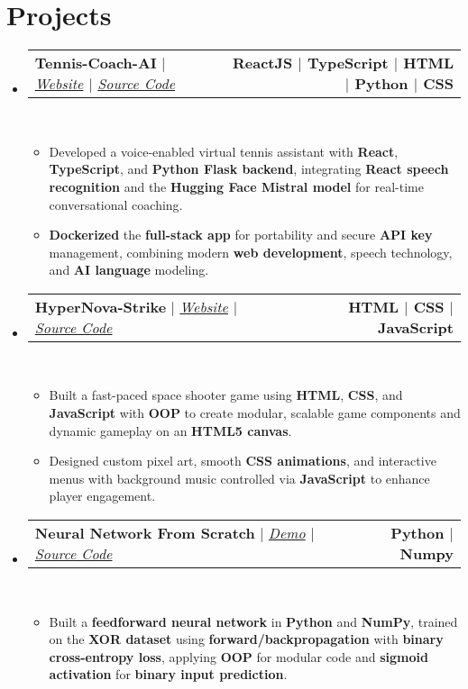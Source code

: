 \documentclass[letterpaper,11pt]{article}
\makeatletter
\newcommand{\resumeItem}[1]{
  \item\small{
    {#1 \vspace{0pt}}
  }
}
\newcommand{\resumeProjectHeading}[2]{
    \item
    \begin{tabular*}{1.001\textwidth}{l@{\extracolsep{\fill}}r}
      \small#1 & \textbf{\small #2}\\
    \end{tabular*}\vspace{-7pt}
}
\newcommand{\resumeSubHeadingListStart}{\begin{itemize}[leftmargin=0.0in, label={}]}
\newcommand{\resumeSubHeadingListEnd}{\end{itemize}}\vspace{0pt}
\newcommand{\resumeItemListStart}{\begin{itemize}}
\newcommand{\resumeItemListEnd}{\end{itemize}\vspace{-5pt}}
\makeatother
\begin{document}
\section{Projects} 
    \vspace{-5pt}
    \resumeSubHeadingListStart
    \resumeProjectHeading
            {\textbf{{Tennis-Coach-AI}} $|$ \emph{\href{https://tennis-coach-ai.vercel.app}{Website}{ $|$ }\href{https://github.com/TejasNaik24/Tennis-Coach-AI}{Source Code}}}{ReactJS $|$ TypeScript $|$ HTML $|$ Python $|$ CSS}
            \\[5mm]
          \resumeItemListStart
            \resumeItem{Developed a voice-enabled virtual tennis assistant with \textbf{React}, \textbf{TypeScript}, and \textbf{Python Flask backend}, integrating \textbf{React speech recognition} and the \textbf{Hugging Face Mistral model} for real-time conversational coaching.}
            \resumeItem{\textbf{Dockerized} the \textbf{full-stack app} for portability and secure \textbf{API key} management, combining modern \textbf{web development}, speech technology, and \textbf{AI language} modeling.}
          \resumeItemListEnd
 \vspace{-20pt}
 \resumeProjectHeading
            {\textbf{{HyperNova-Strike}} $|$ \emph{\href{https://hypernova-strike.vercel.app}{Website}{ $|$ }\href{https://github.com/TejasNaik24/HyperNova-Strike}{Source Code}}}{HTML $|$ CSS $|$ JavaScript}
            \\[5mm]
          \resumeItemListStart
            \resumeItem{Built a fast-paced space shooter game using \textbf{HTML}, \textbf{CSS}, and \textbf{JavaScript} with \textbf{OOP} to create modular, scalable game components and dynamic gameplay on an \textbf{HTML5 canvas}.}
            \resumeItem{Designed custom pixel art, smooth \textbf{CSS animations}, and interactive menus with background music controlled via \textbf{JavaScript} to enhance player engagement.}
          \resumeItemListEnd
 \vspace{-17pt}
 \resumeProjectHeading
{\textbf{{Neural Network From Scratch}} $|$ \emph{\href{https://drive.google.com/file/d/1YpVzB6VQXRyj1WNqQmXgUmp_3Y6uaZax/view?usp=sharing}{Demo}{ $|$ }\href{https://github.com/TejasNaik24/NeuralNetwork-From-Scratch}{Source Code}}}{Python $|$ Numpy}
\\[5mm]
\resumeItemListStart
\resumeItem{Built a \textbf{feedforward neural network} in \textbf{Python} and \textbf{NumPy}, trained on the \textbf{XOR dataset} using \textbf{forward/backpropagation} with \textbf{binary cross-entropy loss}, applying \textbf{OOP} for modular code and \textbf{sigmoid activation} for \textbf{binary input prediction}.}
\resumeItemListEnd
\resumeSubHeadingListEnd
\vspace{-17pt}
\end{document}
